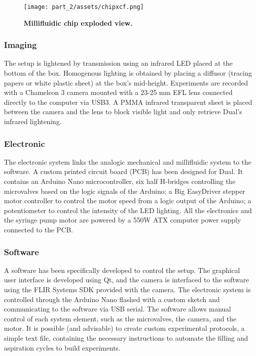     \begin{figure}[h]
      \centering
      \texttt{[image: part\_2/assets/chipxcf.png]}
      \caption{\textbf{Millifluidic chip exploded view.}}
      \label{dual_chip_visu}
    \end{figure}

  \subsubsection{Imaging}
  The setup is lightened by transmission using an infrared LED placed at the bottom of the box. Homogenous lighting is obtained by placing a diffusor (tracing papers or white plastic sheet) at the box's mid-height. Experiments are recorded with a Chameleon 3 camera mounted with a 23-25 mm EFL lens connected directly to the computer via USB3. A PMMA infrared transparent sheet is placed between the camera and the lens to block visible light and only retrieve Dual's infrared lightening.

  \subsubsection{Electronic}
  The electronic system links the analogic mechanical and millifluidic system to the software. A custom printed circuit board (PCB) has been designed for Dual. It contains an Arduino Nano microcontroller, six half H-bridges controlling the microvalves based on the logic signals of the Arduino; a Big EasyDriver stepper motor controller to control the motor speed from a logic output of the Arduino; a potentiometer to control the intensity of the LED lighting. All the electronics and the syringe pump motor are powered by a 550W ATX computer power supply connected to the PCB.

  \subsubsection{Software}
  A software has been specifically developed to control the setup. The graphical user interface is developed using Qt, and the camera is interfaced to the software using the FLIR Systems SDK provided with the camera. The electronic system is controlled through the Arduino Nano flashed with a custom sketch and communicating to the software via USB serial. The software allows manual control of each system element, such as the microvalves, the camera, and the motor. It is possible (and advisable) to create custom experimental protocols, a simple text file, containing the necessary instructions to automate the filling and aspiration cycles to build experiments.

